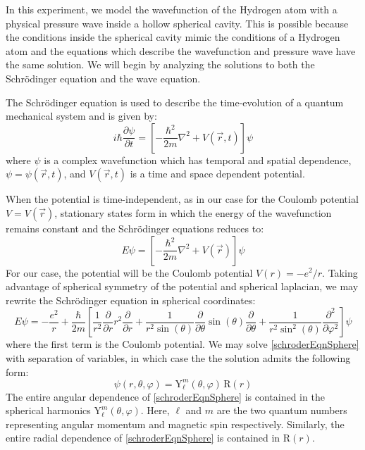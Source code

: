 \documentclass[12pt]{article}
\newcommand{\ppd}[1]{\frac{\partial}{\partial#1}}
\newcommand{\ppsd}[1]{\frac{\partial^2}{\partial #1^2}}
\newcommand{\ppnd}[2]{\frac{\partial #1}{\partial #2}}
\newcommand{\lap}{\nabla^2}
\begin{document}
In this experiment, we model the wavefunction of the Hydrogen atom with a physical pressure wave inside a hollow spherical cavity. This is possible because the conditions inside the spherical cavity mimic the conditions of a Hydrogen atom and the equations which describe the wavefunction and pressure wave have the same solution. We will begin by analyzing the solutions to both the Schr\"odinger equation and the wave equation.


The Schr\"odinger equation is used to describe the time-evolution of a quantum mechanical system and is given by:
\begin{equation}
\label{schrodingerEqn1}
	i\hbar\ppnd{\psi}{t} = \left[-\frac{\hbar^2}{2m}\lap+ V(\vec{r},t)\right] \psi
\end{equation}
where $\psi$ is a complex wavefunction which has temporal and spatial dependence, $\psi = \psi{(\vec{r},t)}$, and $V(\vec{r},t)$ is a time and space dependent potential.

When the potential is time-independent, as in our case for the Coulomb potential $V = V(\vec{r})$, stationary states form in which the energy of the wavefunction remains constant and the Schr\"odinger equations reduces to:
\begin{equation}
\label{schrodingerEqn2}
	E \psi = \left[-\frac{\hbar^2}{2m}\lap + V(\vec{r})\right] \psi
\end{equation}
For our case, the potential will be the Coulomb potential $V(r) = -e^2/r$. Taking advantage of spherical symmetry of the potential and spherical laplacian, we may rewrite the Schr\"odinger equation in spherical coordinates:
\begin{equation}
\label{schroderEqnSphere}
	E \psi = -\frac{e^2}{r} + \frac{\hbar}{2m} \left[ \frac{1}{r^2} \ppd{r}r^2 \ppd{r} + \frac{1}{r^2\sin(\theta)}\ppd{\theta}\sin(\theta)\ppd{\theta} + \frac{1}{r^2\sin^2(\theta)} \ppsd{\varphi} \right] \psi 
\end{equation}
where the first term is the Coulomb potential. We may solve \eqref{schroderEqnSphere} with separation of variables, in which case the the solution admits the following form:
\begin{equation}
	\psi(r,\theta,\varphi) = \mathrm{Y}_\ell^m(\theta,\varphi) \, \mathrm{R}(r)
\end{equation}
The entire angular dependence of \eqref{schroderEqnSphere} is contained in the spherical harmonics $\mathrm{Y}_\ell^m(\theta,\varphi)$. Here, $\ell$ and $m$ are the two quantum numbers representing angular momentum and magnetic spin respectively. Similarly, the entire radial dependence of \eqref{schroderEqnSphere} is contained in $\mathrm{R}(r)$.
\end{document}
